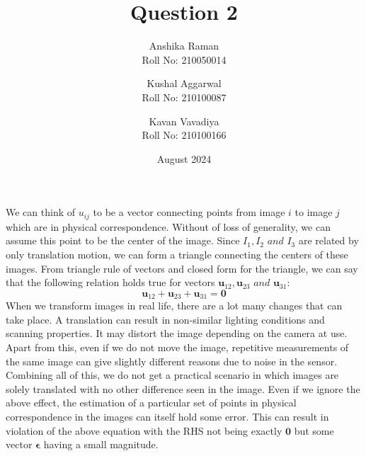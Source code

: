 \documentclass[a4paper,12pt]{article}
\title{Question 2}
\author{Anshika Raman \\ Roll No: 210050014
    \and Kushal Aggarwal \\ Roll No: 210100087
    \and Kavan Vavadiya \\ Roll No: 210100166}
\date{August 2024}
\begin{document}
\maketitle

\renewcommand{\cftsecleader}{\cftdotfill{\cftdotsep}}

We can think of $u_{ij}$ to be a vector connecting points from image $i$ to image $j$ which are in physical correspondence. Without of loss of generality, we can assume this point to be the center of the image. Since $I_1, I_2 \textit{ and } I_3$ are related by only translation motion, we can form a triangle connecting the centers of these images. From triangle rule of vectors and closed form for the triangle, we can say that the following relation holds true for vectors $\mathbf{u}_{12}, \mathbf{u}_{23}\textit{ and }\mathbf{u}_{31}$:
\begin{equation}
    \mathbf{u}_{12}+\mathbf{u}_{23}+\mathbf{u}_{31}=\mathbf{0}
\end{equation}
When we transform images in real life, there are a lot many changes that can take place. A translation can result in non-similar lighting conditions and scanning properties. It may distort the image depending on the camera at use. Apart from this, even if we do not move the image, repetitive measurements of the same image can give slightly different reasons due to noise in the sensor. Combining all of this, we do not get a practical scenario in which images are solely translated with no other difference seen in the image. Even if we ignore the above effect, the estimation of a particular set of points in physical correspondence in the images can itself hold some error. This can result in violation of the above equation with the RHS not being exactly $\mathbf{0}$ but some vector $\mathbf{\epsilon}$ having a small magnitude.
\end{document}
